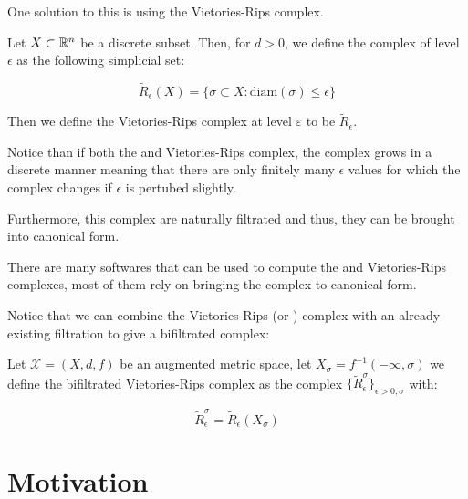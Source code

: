 One solution to this is using the 
Vietories-Rips complex.



\begin{definition}
Let $X\subset \mathbb{R}^n$ be a discrete subset. Then, for $d>0$, we define the \Cech
complex of level $\epsilon$ as the following simplicial set:

$$
\tilde{R}_\epsilon(X)
=
\{
\sigma \subset X :
\text{diam}(\sigma)\leq \epsilon
\}
$$

\end{definition}

Then we define the Vietories-Rips complex at level $\varepsilon$ to be $\tilde{R}_\epsilon$.


\begin{remark}
Notice than if both the {\Cech} and Vietories-Rips complex, the complex grows in a discrete manner meaning
that there are only finitely many $\epsilon$ values for which the complex changes if $\epsilon$ is pertubed slightly.

Furthermore, this complex are naturally filtrated and thus, they can be brought into canonical form.
\end{remark}

There are many softwares that can be used to compute the
{\Cech} and Vietories-Rips complexes, most of them rely on bringing the complex to canonical form.


Notice that we can combine the Vietories-Rips (or {\Cech}) complex 
with an already existing filtration to give a bifiltrated complex:

\begin{definition}

Let $\mathcal{X}=(X,d,f)$ be an augmented metric space,
let $X_\sigma=f^{-1}(-\infty,\sigma)$ we define the bifiltrated
Vietories-Rips complex as the complex
$\{\tilde{R}_\epsilon^\sigma\}_{\epsilon>0,\sigma}$
with:

$$
\tilde{R}_\epsilon^\sigma=
\tilde{R}_\epsilon(X_\sigma)
$$

\end{definition}

\section{Motivation}


